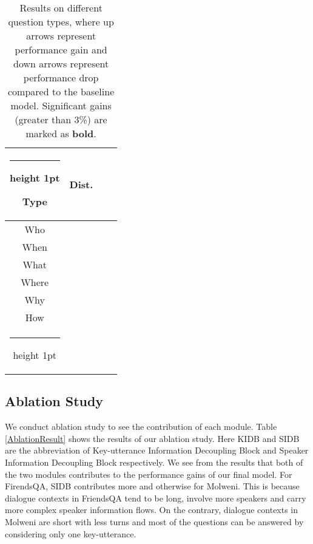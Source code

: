 \documentclass[11pt]{article}
\makeatletter
\newcommand{\thickhline}{\noalign {\ifnum 0=`}\fi \hrule height 1pt
	\futurelet \reserved@a \@xhline
}
\makeatother
\begin{document}
	\begin{table}[tbp]
		\centering
		\begin{tabular}{c|c||c|c}
			\thickhline
			Type & Dist. &  & \\
			\hline \hline
			Who &  &  & \\
			When &  &  & \\
			What &  &  & \\
			Where &  &  & \\
			Why &  &  & \\
			How &  &  & \\
			\thickhline
		\end{tabular}
		\caption{Results on different question types, where up arrows represent performance gain and down arrows represent performance drop compared to the baseline model. Significant gains (greater than 3\%) are marked as \textbf{bold}.}
		\label{PerformanceGains}
	\end{table}
	
	\subsection{Ablation Study}
	We conduct ablation study to see the contribution of each module. Table \ref{AblationResult} shows the results of our ablation study. Here KIDB and SIDB are the abbreviation of Key-utterance Information Decoupling Block and Speaker Information Decoupling Block respectively. We see from the results that both of the two modules contributes to the performance gains of our final model. For FirendsQA, SIDB contributes more and otherwise for Molweni. This is because dialogue contexts in FriendsQA tend to be long, involve more speakers and carry more complex speaker information flows. On the contrary, dialogue contexts in Molweni are short with less turns and most of the questions can be answered by considering only one key-utterance.
	
\end{document}
